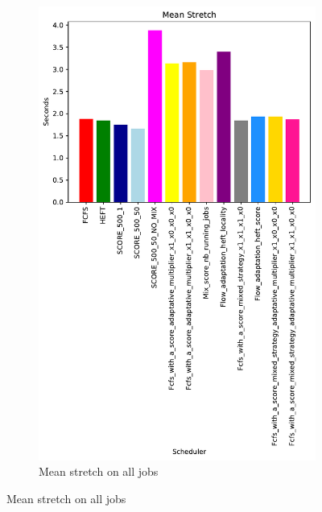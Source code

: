 \documentclass[a4paper]{article}
\begin{document}
\begin{figure}[H]
\begin{subfigure}[b]{0.4\linewidth}\centering\includegraphics[width=0.9\linewidth]{MBSS/plot/Results_FCFS_Score_Adaptative_Multiplier_2022-01-17->2022-01-17_V9271_Mean_Stretch_450_128_32_256_4_1024.pdf}\caption{Mean stretch on all jobs}\end{subfigure}

\end{figure}
\end{document}
